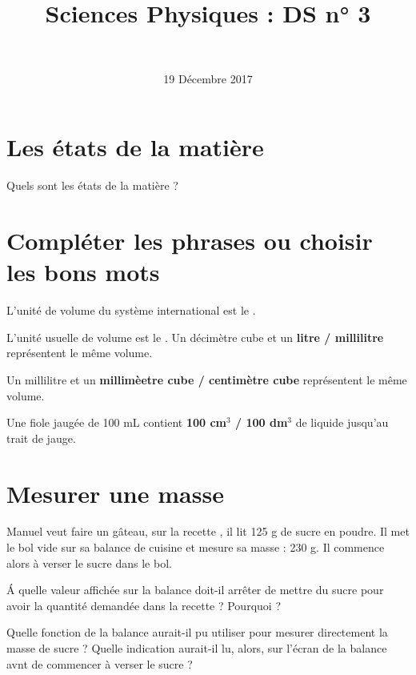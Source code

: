 \documentclass[a4paper,11pt]{exam}
\author{\ }
\date{19 Décembre 2017}
\title{Sciences Physiques : DS n° 3}
\begin{document}
%	

	\maketitle
\vspace*{-0.5cm}	
\section{Les états de la matière}

\begin{questions}
	\question Quels sont les états de la matière ? 
	\fillwithdottedlines{2cm}
\end{questions}

\section{Compléter les phrases ou choisir les bons mots}

\begin{questions}
	\question L'unité de volume du système international est le \fillin .
	
	\question L'unité usuelle de volume est le \fillin .
	\question Un décimètre cube et un \textbf{litre / millilitre} représentent le même volume.
	
	\question Un millilitre et un \textbf{millimèetre cube / centimètre cube} représentent le même volume.
	
	\question Une fiole jaugée de 100 mL contient \textbf{100 cm$^3$ / 100 dm$^3$} de liquide jusqu'au trait de jauge.
\end{questions}

\newpage

\section{Mesurer une masse}

Manuel veut faire un gâteau, sur la recette , il lit 125 g de sucre en poudre. Il met le bol vide sur sa balance de cuisine et mesure sa masse : 230 g. Il commence alors à verser le sucre dans le bol.
\begin{questions}

	\question \'A quelle valeur affichée sur la balance doit-il arrêter de mettre du sucre pour avoir la quantité demandée dans la recette ? Pourquoi ?
	
	\fillwithdottedlines{4cm}

	\question Quelle fonction de la balance aurait-il pu utiliser pour mesurer directement la masse de sucre ? Quelle indication aurait-il lu, alors, sur l'écran de la balance avnt de commencer à verser le sucre ?
	
		\fillwithdottedlines{4cm}
\end{questions}
\ \label{LastPage}
\end{document}
